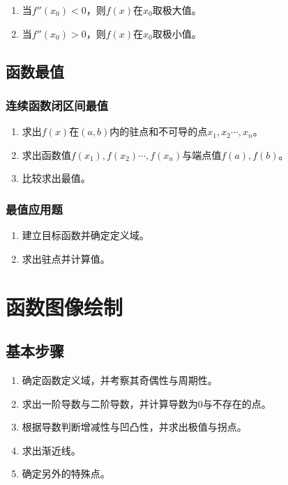 \documentclass[UTF8, 12pt]{ctexart}
\begin{document}
\begin{enumerate}
    \item 当$f''(x_0)<0$，则$f(x)$在$x_0$取极大值。
    \item 当$f''(x_0)>0$，则$f(x)$在$x_0$取极小值。
\end{enumerate}

\subsection{函数最值}

\subsubsection{连续函数闭区间最值}

\begin{enumerate}
    \item 求出$f(x)$在$(a,b)$内的驻点和不可导的点$x_1,x_2\cdots,x_n$。
    \item 求出函数值$f(x_1),f(x_2)\cdots,f(x_n)$与端点值$f(a),f(b)$。
    \item 比较求出最值。
\end{enumerate}

\subsubsection{最值应用题}

\begin{enumerate}
    \item 建立目标函数并确定定义域。
    \item 求出驻点并计算值。
\end{enumerate}

\section{函数图像绘制}

\subsection{基本步骤}

\begin{enumerate}
    \item 确定函数定义域，并考察其奇偶性与周期性。
    \item 求出一阶导数与二阶导数，并计算导数为0与不存在的点。
    \item 根据导数判断增减性与凹凸性，并求出极值与拐点。
    \item 求出渐近线。
    \item 确定另外的特殊点。
\end{enumerate}
\end{document}
